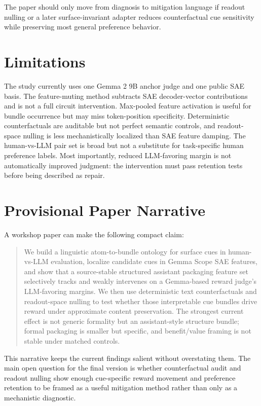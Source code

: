 \documentclass[11pt]{article}
\begin{document}
The paper should only move from diagnosis to mitigation language if readout
nulling or a later surface-invariant adapter reduces counterfactual cue
sensitivity while preserving most general preference behavior.

\section{Limitations}

The study currently uses one Gemma 2 9B anchor judge and one public SAE basis.
The feature-muting method subtracts SAE decoder-vector contributions and is not
a full circuit intervention. Max-pooled feature activation is useful for bundle
occurrence but may miss token-position specificity. Deterministic
counterfactuals are auditable but not perfect semantic controls, and
readout-space nulling is less mechanistically localized than SAE feature
damping. The human-vs-LLM pair set is broad but not a substitute for
task-specific human preference labels. Most importantly, reduced LLM-favoring
margin is not automatically improved judgment: the intervention must pass
retention tests before being described as repair.

\section{Provisional Paper Narrative}

A workshop paper can make the following compact claim:

\begin{quote}
We build a linguistic atom-to-bundle ontology for surface cues in
human-vs-LLM evaluation, localize candidate cues in Gemma Scope SAE features,
and show that a source-stable structured assistant packaging feature set
selectively tracks and weakly intervenes on a Gemma-based reward judge's
LLM-favoring margins. We then use deterministic text counterfactuals and
readout-space nulling to test whether those interpretable cue bundles drive
reward under approximate content preservation. The strongest current effect is
not generic formality but an assistant-style structure bundle; formal packaging
is smaller but specific, and benefit/value framing is not stable under matched
controls.
\end{quote}

This narrative keeps the current findings salient without overstating them.
The main open question for the final version is whether counterfactual audit
and readout nulling show enough cue-specific reward movement and preference
retention to be framed as a useful mitigation method rather than only as a
mechanistic diagnostic.



\end{document}
